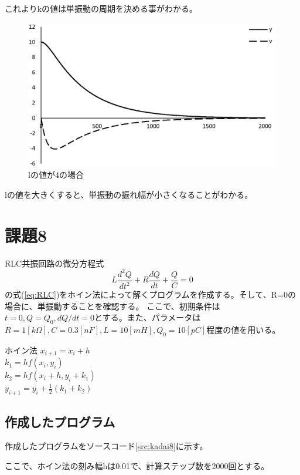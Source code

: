 \documentclass[11pt,titlepage]{jsarticle}
\begin{document}
これよりkの値は単振動の周期を決める事がわかる。

\begin{figure}[H]
\centering
\includegraphics[width=12cm]{img/kadai7_l.png}
\caption{lの値が4の場合}
\label{fig:kadai7_l}
\end{figure}

lの値を大きくすると、単振動の振れ幅が小さくなることがわかる。


\section{課題8}
RLC共振回路の微分方程式
\begin{equation}
\label{eq:RLC}
	L\frac{d^2Q}{dt^2}+R\frac{dQ}{dt}+\frac{Q}{C}=0
\end{equation}
の式(\ref{eq:RLC})をホイン法によって解くプログラムを作成する。そして、R=0の場合に、単振動することを確認する。
ここで、初期条件は$t=0, Q=Q_0, dQ/dt=0$とする。また、パラメータは$R=1[k\Omega], C=0.3[nF], L=10[mH], Q_0=10[pC]$程度の値を用いる。

\begin{itembox}[l]{ホイン法}
\centering
	$x_{i+1}=x_i+h$\\
	$k_1=hf(x_i,y_i)$\\
	$k_2=hf(x_i+h,y_i+k_1)$\\
	$y_{i+1}=y_i+\frac{1}{2}(k_1+k_2)$
\end{itembox}

\subsection{作成したプログラム}
作成したプログラムをソースコード\ref{src:kadai8}に示す。



ここで、ホイン法の刻み幅hは0.01で、計算ステップ数を2000回とする。
\end{document}
